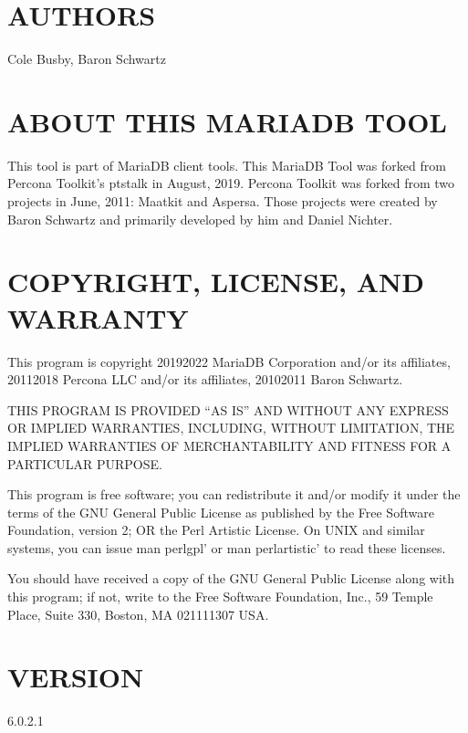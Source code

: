 \documentclass[letterpaper,10pt,english]{sphinxmanual}
\begin{document}
\section{AUTHORS}
\label{\detokenize{mariadb-stat-browser:authors}}
Cole Busby, Baron Schwartz


\section{ABOUT THIS MARIADB TOOL}
\label{\detokenize{mariadb-stat-browser:about-this-mariadb-tool}}
This tool is part of MariaDB client tools. This MariaDB Tool was forked from
Percona Toolkit’s pt\sphinxhyphen{}stalk in August, 2019. Percona Toolkit was forked from two
projects in June, 2011: Maatkit and Aspersa.  Those projects were created by
Baron Schwartz and primarily developed by him and Daniel Nichter.


\section{COPYRIGHT, LICENSE, AND WARRANTY}
\label{\detokenize{mariadb-stat-browser:copyright-license-and-warranty}}
This program is copyright 2019\sphinxhyphen{}2022 MariaDB Corporation and/or its affiliates,
2011\sphinxhyphen{}2018 Percona LLC and/or its affiliates, 2010\sphinxhyphen{}2011 Baron Schwartz.

THIS PROGRAM IS PROVIDED “AS IS” AND WITHOUT ANY EXPRESS OR IMPLIED
WARRANTIES, INCLUDING, WITHOUT LIMITATION, THE IMPLIED WARRANTIES OF
MERCHANTABILITY AND FITNESS FOR A PARTICULAR PURPOSE.

This program is free software; you can redistribute it and/or modify it under
the terms of the GNU General Public License as published by the Free Software
Foundation, version 2; OR the Perl Artistic License.  On UNIX and similar
systems, you can issue \textasciigrave{}man perlgpl’ or \textasciigrave{}man perlartistic’ to read these
licenses.

You should have received a copy of the GNU General Public License along with
this program; if not, write to the Free Software Foundation, Inc., 59 Temple
Place, Suite 330, Boston, MA  02111\sphinxhyphen{}1307  USA.


\section{VERSION}
\label{\detokenize{mariadb-stat-browser:version}}
 6.0.2.1
\end{document}
